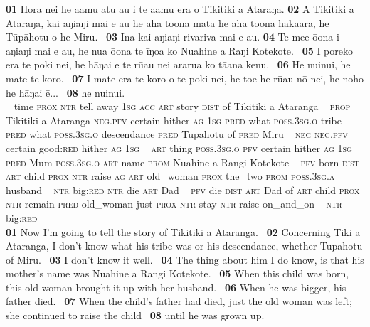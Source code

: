 \bigskip\gll
\textbf{\textup{01}} Hora nei he {\ꞌ}a{\ꞌ}amu atu au i te {\ꞌ}a{\ꞌ}amu era o Tikitiki {\ꞌ}a {\ꞌ}Ataraŋa. \textbf{\textup{02}} A Tikitiki {\ꞌ}a {\ꞌ}Ataraŋa, kai aŋiaŋi mai e au he aha tō{\ꞌ}ona mata he aha tō{\ꞌ}ona hakaara, he Tūpāhotu {\ꞌ}o he Miru. ~\textbf{\textup{03}} {\ꞌ}Ina kai aŋiaŋi rivariva mai e au. \textbf{\textup{04}} Te me{\ꞌ}e ō{\ꞌ}ona i aŋiaŋi mai e au, he nua ō{\ꞌ}ona te {\ꞌ}īŋoa ko Nuahine {\ꞌ}a Raŋi Kotekote. ~\textbf{\textup{05}} I poreko era te poki nei, he hāŋai e te rū{\ꞌ}au nei ararua ko tā{\ꞌ}ana kenu. ~\textbf{\textup{06}} He nuinui, he mate te koro. ~\textbf{\textup{07}} I mate era te koro o te poki nei, he toe he rū{\ꞌ}au nō nei, he noho he hāŋai ē... ~\textbf{\textup{08}} he nuinui.\\
~ time \textsc{prox} \textsc{ntr} tell away \textsc{1sg} \textsc{acc} \textsc{art} story \textsc{dist} of Tikitiki a Ataranga  ~ \textsc{prop} Tikitiki a Ataranga \textsc{neg.pfv} certain hither \textsc{ag} \textsc{1sg} \textsc{pred} what \textsc{poss.3sg.o} tribe \textsc{pred} what \textsc{poss.3sg.o} descendance \textsc{pred} Tupahotu of \textsc{pred} Miru ~ \textsc{neg} \textsc{neg.pfv} certain good:\textsc{red} hither \textsc{ag} \textsc{1sg} ~ \textsc{art} thing \textsc{poss.3sg.o} \textsc{pfv} certain hither \textsc{ag} \textsc{1sg} \textsc{pred} Mum \textsc{poss.3sg.o} \textsc{art} name \textsc{prom} Nuahine a Rangi Kotekote ~ \textsc{pfv} born \textsc{dist} \textsc{art} child \textsc{prox} \textsc{ntr} raise \textsc{ag} \textsc{art} old\_woman \textsc{prox} the\_two \textsc{prom} \textsc{poss.3sg.a} husband ~ \textsc{ntr} big:\textsc{red} \textsc{ntr} die \textsc{art} Dad ~ \textsc{pfv} die \textsc{dist} \textsc{art} Dad of \textsc{art} child \textsc{prox} \textsc{ntr} remain \textsc{pred} old\_woman just \textsc{prox} \textsc{ntr} stay \textsc{ntr} raise on\_and\_on ~ \textsc{ntr} big:\textsc{red}\\

\medskip\glt
\textbf{\textup{01}} Now I’m going to tell the story of Tikitiki a Ataranga. ~\textbf{\textup{02}} Concerning Tiki a Ataranga, I don’t know what his tribe was or his descendance, whether Tupahotu of Miru. ~\textbf{\textup{03}} I don’t know it well. ~\textbf{\textup{04}} The thing about him I do know, is that his mother’s name was Nuahine a Rangi Kotekote. ~\textbf{\textup{05}} When this child was born, this old woman brought it up with her husband. ~\textbf{\textup{06}} When he was bigger, his father died. ~\textbf{\textup{07}} When the child’s father had died, just the old woman was left; she continued to raise the child ~\textbf{\textup{08}} until he was grown up.


